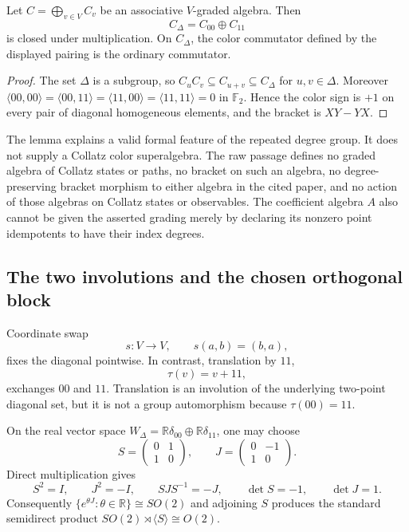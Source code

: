 \begin{lemma}
\label{lem:chatnotes-isotropic-diagonal}
Let $C=\bigoplus_{v\in V}C_v$ be an associative $V$-graded algebra.  Then
\[
 C_\Delta=C_{00}\oplus C_{11}
\]
is closed under multiplication.  On $C_\Delta$, the color commutator defined
by the displayed pairing is the ordinary commutator.
\end{lemma}

\begin{proof}
The set $\Delta$ is a subgroup, so $C_uC_v\subseteq C_{u+v}\subseteq
C_\Delta$ for $u,v\in\Delta$.  Moreover
$\langle00,00\rangle=\langle00,11\rangle=
\langle11,00\rangle=\langle11,11\rangle=0$ in $\mathbb F_2$.
Hence the color sign is $+1$ on every pair of diagonal homogeneous elements,
and the bracket is $XY-YX$.
\end{proof}

The lemma explains a valid formal feature of the repeated degree group.  It
does not supply a Collatz color superalgebra.  The raw passage defines no
graded algebra of Collatz states or paths, no bracket on such an algebra, no
degree-preserving bracket morphism to either algebra in the cited paper, and
no action of those algebras on Collatz states or observables.  The coefficient
algebra $A$ also cannot be given the asserted grading merely by declaring its
nonzero point idempotents to have their index degrees.

\subsection{The two involutions and the chosen orthogonal block}

Coordinate swap
\[
 s:V\longrightarrow V,
 \qquad s(a,b)=(b,a),
\]
fixes the diagonal pointwise.  In contrast, translation by $11$,
\[
 \tau(v)=v+11,
\]
exchanges $00$ and $11$.  Translation is an involution of the underlying
two-point diagonal set, but it is not a group automorphism because
$\tau(00)=11$.

On the real vector space
$W_\Delta=\mathbb R\delta_{00}\oplus\mathbb R\delta_{11}$, one may choose
\[
 S=\begin{pmatrix}0&1\\1&0\end{pmatrix},
 \qquad
 J=\begin{pmatrix}0&-1\\1&0\end{pmatrix}.
\]
Direct multiplication gives
\[
 S^2=I,
 \qquad J^2=-I,
 \qquad SJS^{-1}=-J,
 \qquad \det S=-1,
 \qquad \det J=1.
\]
Consequently $\{e^{\theta J}:\theta\in\mathbb R\}\cong SO(2)$ and adjoining
$S$ produces the standard semidirect product $SO(2)\rtimes\langle S\rangle
\cong O(2)$.

